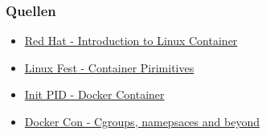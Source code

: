 \documentclass{beamer}
\begin{document}
\begin{frame}
  \frametitle{Quellen}
  \begin{itemize}
    \item {\href{https://docs.redhat.com/en/documentation/red_hat_enterprise_linux_atomic_host/7/html/overview_of_containers_in_red_hat_systems/introduction_to_linux_containers#overview}{Red Hat - Introduction to Linux Container}}
    \item {\href{https://www.youtube.com/watch?v=x1npPrzyKfs&t=1431s&ab_channel=linuxfestnorthwest}{Linux Fest - Container Pirimitives}}
    \item {\href{https://daveiscoding.hashnode.dev/why-do-you-need-an-init-process-inside-your-docker-container-pid-1#heading-signals}{Init PID - Docker Container}}
    \item {\href{https://www.youtube.com/watch?v=sK5i-N34im8&t=1541s&ab_channel=Docker}{Docker Con - Cgroups, namepsaces and beyond}}
  \end{itemize}
\end{frame}
\end{document}
